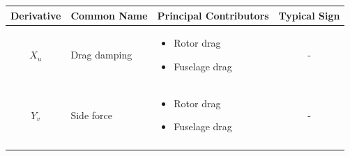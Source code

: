 \documentclass[
]{book}
\providecommand{\tightlist}{%
  \setlength{\itemsep}{0pt}\setlength{\parskip}{0pt}}
\begin{document}
\begin{longtable}[]{@{}cllc@{}}
\toprule
\begin{minipage}[b]{0.18\columnwidth}\centering
\textbf{Derivative}\strut
\end{minipage} & \begin{minipage}[b]{0.19\columnwidth}\raggedright
\textbf{Common Name}\strut
\end{minipage} & \begin{minipage}[b]{0.31\columnwidth}\raggedright
\textbf{Principal Contributors}\strut
\end{minipage} & \begin{minipage}[b]{0.20\columnwidth}\centering
\textbf{Typical Sign}\strut
\end{minipage}\tabularnewline
\midrule
\endhead
\begin{minipage}[t]{0.18\columnwidth}\centering
\(X_u\)\strut
\end{minipage} & \begin{minipage}[t]{0.19\columnwidth}\raggedright
Drag damping\strut
\end{minipage} & \begin{minipage}[t]{0.31\columnwidth}\raggedright
\begin{itemize}
\tightlist
\item
  Rotor drag
\item
  Fuselage drag
\end{itemize}\strut
\end{minipage} & \begin{minipage}[t]{0.20\columnwidth}\centering
-\strut
\end{minipage}\tabularnewline
\begin{minipage}[t]{0.18\columnwidth}\centering
\(Y_v\)\strut
\end{minipage} & \begin{minipage}[t]{0.19\columnwidth}\raggedright
Side force\strut
\end{minipage} & \begin{minipage}[t]{0.31\columnwidth}\raggedright
\begin{itemize}
\tightlist
\item
  Rotor drag
\item
  Fuselage drag
\end{itemize}\strut
\end{minipage} & \begin{minipage}[t]{0.20\columnwidth}\centering
-\strut
\end{minipage}\tabularnewline
\begin{minipage}[t]{0.18\columnwidth}\centering

\end{minipage}
\end{longtable}
\end{document}
